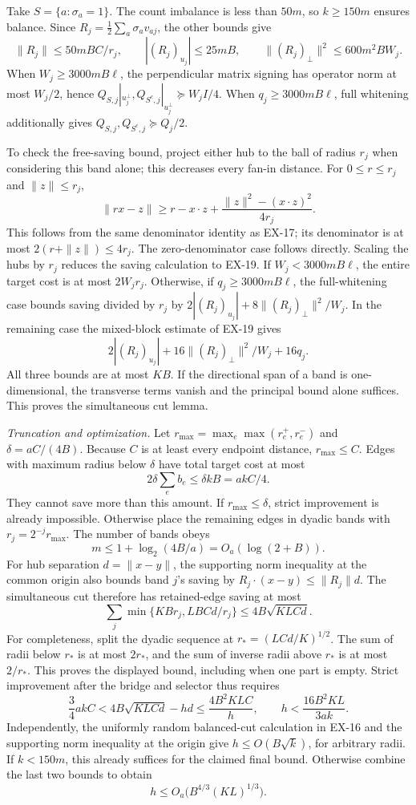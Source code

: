 Take $S=\{a:\sigma_a=1\}$. The count imbalance is less than $50m$,
so $k\geq150m$ ensures balance. Since
$R_j=\tfrac12\sum_a\sigma_av_{aj}$, the other bounds give
\[
 \|R_j\|\leq50mBC/r_j,\qquad
 |(R_j)_{u_j}|\leq25mB,\qquad
 \|(R_j)_\perp\|^2\leq600m^2BW_j.
\]
When $W_j\geq3000mB\ell$, the perpendicular matrix signing has
operator norm at most $W_j/2$, hence
$Q_{S,j}|_{u_j^\perp},Q_{S^c,j}|_{u_j^\perp}\succeq W_jI/4$.
When $q_j\geq3000mB\ell$, full whitening additionally gives
$Q_{S,j},Q_{S^c,j}\succeq Q_j/2$.

To check the free-saving bound, project either hub to the ball of
radius $r_j$ when considering this band alone; this decreases every
fan-in distance. For $0\leq r\leq r_j$ and $\|z\|\leq r_j$,
\[
 \|rx-z\|\geq r-x\cdot z+
       \frac{\|z\|^2-(x\cdot z)^2}{4r_j}.
\]
This follows from the same denominator identity as EX-17; its
denominator is at most $2(r+\|z\|)\leq4r_j$. The zero-denominator
case follows directly. Scaling the hubs by $r_j$ reduces the saving
calculation to EX-19. If $W_j<3000mB\ell$, the entire target cost
is at most $2W_jr_j$. Otherwise, if
$q_j\geq3000mB\ell$, the full-whitening case bounds saving divided
by $r_j$ by
$2|(R_j)_{u_j}|+8\|(R_j)_\perp\|^2/W_j$.
In the remaining case the mixed-block estimate of EX-19 gives
\[
 2|(R_j)_{u_j}|+16\|(R_j)_\perp\|^2/W_j+16q_j.
\]
All three bounds are at most $KB$. If the directional span of a band
is one-dimensional, the transverse terms vanish and the principal
bound alone suffices. This proves the simultaneous cut lemma.

\emph{Truncation and optimization.}
Let $r_{\max}=\max_e\max(r_e^+,r_e^-)$ and
$\delta=aC/(4B)$. Because $C$ is at least every endpoint distance,
$r_{\max}\leq C$. Edges with maximum radius below $\delta$ have
total target cost at most
\[
 2\delta\sum_e b_e\leq\delta kB=akC/4.
\]
They cannot save more than this amount. If $r_{\max}\leq\delta$,
strict improvement is already impossible. Otherwise place the
remaining edges in dyadic bands with
$r_j=2^{-j}r_{\max}$. The number of bands obeys
\[
 m\leq1+\log_2(4B/a)=O_a(\log(2+B)).
\]
For hub separation $d=\|x-y\|$, the supporting norm inequality
at the common origin also bounds band $j$'s saving by
$R_j\cdot(x-y)\leq\|R_j\|d$. The simultaneous cut therefore has
retained-edge saving at most
\[
 \sum_j\min\{KBr_j,LBCd/r_j\}
 \leq4B\sqrt{KLCd}.
\]
For completeness, split the dyadic sequence at
$r_*=(LCd/K)^{1/2}$. The sum of radii below $r_*$ is at most
$2r_*$, and the sum of inverse radii above $r_*$ is at most
$2/r_*$. This proves the displayed bound, including when one part
is empty. Strict improvement after the bridge and selector thus
requires
\[
 \frac34akC<4B\sqrt{KLCd}-hd
 \leq\frac{4B^2KLC}{h},
 \qquad
 h<\frac{16B^2KL}{3ak}.
\]
Independently, the uniformly random balanced-cut calculation in
EX-16 and the supporting norm inequality at the origin give
$h\leq O(B\sqrt k)$, for arbitrary radii. If $k<150m$, this
already suffices for the claimed final bound. Otherwise combine
the last two bounds to obtain
\[
 h\leq O_a\bigl(B^{4/3}(KL)^{1/3}\bigr).
\]


